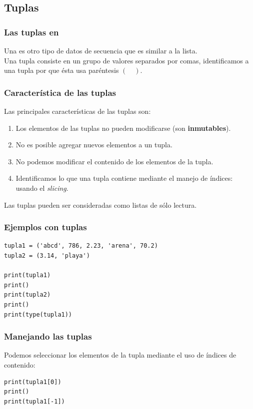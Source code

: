 \documentclass[12pt]{beamer}
\begin{document}
\subsection{Tuplas}

\begin{frame}
\frametitle{Las tuplas en \python}
Una  es otro tipo de datos de secuencia que es similar a la lista.
\\
\bigskip
\pause
Una tupla consiste en un grupo de valores separados por comas, identificamos a una tupla por que ésta usa paréntesis $( \quad )$.
\end{frame}
\begin{frame}
\frametitle{Característica de las tuplas}
Las principales características de las tuplas son:
\pause
{}
\begin{enumerate}[<+->]
\item Los elementos de las tuplas no pueden modificarse (son \textbf{inmutables}).
\item No es posible agregar nuevos elementos a un tupla.
\item No podemos modificar el contenido de los elementos de la tupla.
\item Identificamos lo que una tupla contiene mediante el manejo de índices: usando el \emph{slicing}.
\end{enumerate}
\pause
Las tuplas pueden ser consideradas como listas de sólo lectura.
\end{frame}
\begin{frame}[fragile]
\frametitle{Ejemplos con tuplas}
\begin{lstlisting}[caption=Definiendo tuplas]
tupla1 = ('abcd', 786, 2.23, 'arena', 70.2)
tupla2 = (3.14, 'playa')

print(tupla1)
print()
print(tupla2)
print()
print(type(tupla1))
\end{lstlisting}
\end{frame}
\begin{frame}[fragile]
\frametitle{Manejando las tuplas}
Podemos seleccionar los elementos de la tupla mediante el uso de índices de contenido:
\pause
\begin{lstlisting}[caption=Recuperando elementos de una tupla]
print(tupla1[0])
print()
print(tupla1[-1])
\end{lstlisting}
\end{frame}
\end{document}

